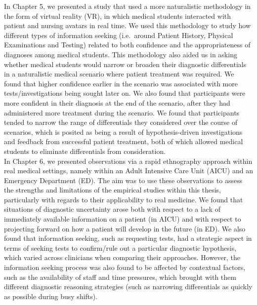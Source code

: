 \documentclass[a4paper, nobind]{templates/ociamthesis}
\begin{document}
In Chapter 5, we presented a study that used a more naturalistic methodology in the form of virtual reality (VR), in which medical students interacted with patient and nursing avatars in real time. We used this methodology to study how different types of information seeking (i.e.~around Patient History, Physical Examinations and Testing) related to both confidence and the appropriateness of diagnoses among medical students. This methodology also aided us in asking whether medical students would narrow or broaden their diagnostic differentials in a naturalistic medical scenario where patient treatment was required. We found that higher confidence earlier in the scenario was associated with more tests/investigations being sought later on. We also found that participants were more confident in their diagnosis at the end of the scenario, after they had administered more treatment during the scenario. We found that participants tended to narrow the range of differentials they considered over the course of scenarios, which is posited as being a result of hypothesis-driven investigations and feedback from successful patient treatment, both of which allowed medical students to eliminate differentials from consideration.\\

In Chapter 6, we presented observations via a rapid ethnography approach within real medical settings, namely within an Adult Intensive Care Unit (AICU) and an Emergency Department (ED). The aim was to use these observations to assess the strengths and limitations of the empirical studies within this thesis, particularly with regards to their applicability to real medicine. We found that situations of diagnostic uncertainty arose both with respect to a lack of immediately available information on a patient (in AICU) and with respect to projecting forward on how a patient will develop in the future (in ED). We also found that information seeking, such as requesting tests, had a strategic aspect in terms of seeking tests to confirm/rule out a particular diagnostic hypothesis, which varied across clinicians when comparing their approaches. However, the information seeking process was also found to be affected by contextual factors, such as the availability of staff and time pressures, which brought with them different diagnostic reasoning strategies (such as narrowing differentials as quickly as possible during busy shifts).\\
\end{document}
